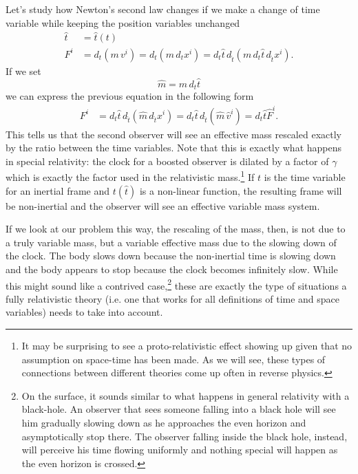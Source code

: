 Let's study how Newton's second law changes if we make a change of time variable while keeping the position variables unchanged
\begin{equation}
	\begin{aligned}
		\hat{t}&=\hat{t}(t) \\
		F^i &= d_t  (m \, v^i) = d_t  (m \, d_t x^i) = d_t \hat{t} \, d_{\hat{t}}  (m \, d_t \hat{t} \, d_{\hat{t}} x^i).
	\end{aligned}
\end{equation}
If we set
\begin{equation}
	\hat{m} = m \, d_t \hat{t}
\end{equation}
we can express the previous equation in the following form
\begin{equation}
	\begin{aligned}
		F^i &= d_t \hat{t} \, d_{\hat{t}}  (\hat{m} \, d_{\hat{t}} x^i) = d_t \hat{t} \, d_{\hat{t}}  (\hat{m} \, \hat{v}^i) = d_t \hat{t} \hat{F}^i.
	\end{aligned}
\end{equation}
This tells us that the second observer will see an effective mass rescaled exactly by the ratio between the time variables. Note that this is exactly what happens in special relativity: the clock for a boosted observer is dilated by a factor of $\gamma$ which is exactly the factor used in the relativistic mass.\footnote{It may be surprising to see a proto-relativistic effect showing up given that no assumption on space-time has been made. As we will see, these types of connections between different theories come up often in reverse physics.} If $t$ is the time variable for an inertial frame and $t(\hat{t})$ is a non-linear function, the resulting frame will be non-inertial and the observer will see an effective variable mass system.

If we look at our problem this way, the rescaling of the mass, then, is not due to a truly variable mass, but a variable effective mass due to the slowing down of the clock. The body slows down because the non-inertial time is slowing down and the body appears to stop because the clock becomes infinitely slow. While this might sound like a contrived case,\footnote{On the surface, it sounds similar to what happens in general relativity with a black-hole. An observer that sees someone falling into a black hole will see him gradually slowing down as he approaches the even horizon and asymptotically stop there. The observer falling inside the black hole, instead, will perceive his time flowing uniformly and nothing special will happen as the even horizon is crossed.} these are exactly the type of situations a fully relativistic theory (i.e. one that works for all definitions of time and space variables) needs to take into account.

